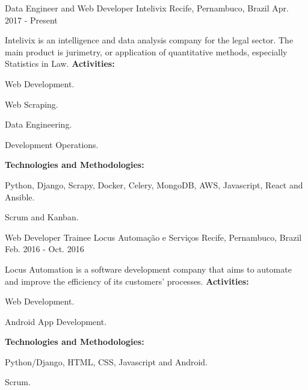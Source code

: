 


\begin{cventries}


\cventry
{Data Engineer and Web Developer} %
{Intelivix} %
{Recife, Pernambuco, Brazil} %
{Apr. 2017 - Present} %
{ %
Intelivix is an intelligence and data analysis company for the legal sector. The main product is
jurimetry, or application of quantitative methods, especially Statistics in Law. \vspace{1.5mm} \hfill \break
\textbf{Activities:} \hfill \break
\begin{cvitems}
\item {Web Development.}
\item {Web Scraping.}
\item {Data Engineering.}
\item {Development Operations.}
\end{cvitems} \vspace{1.5mm} \hfill \break
\textbf{Technologies and Methodologies:} \hfill \break
\begin{cvitems}
\item {Python, Django, Scrapy, Docker, Celery, MongoDB, AWS, Javascript, React and Ansible.}
\item {Scrum and Kanban.}
\end{cvitems}
}


\cventry
{Web Developer Trainee} %
{Locus Automação e Serviços} %
{Recife, Pernambuco, Brazil} %
{Feb. 2016 - Oct. 2016} %
{ %
Locus Automation is a software development company that aims to automate and improve the
efficiency of its customers' processes. \vspace{1.5mm} \hfill \break
\textbf{Activities:} \hfill \break
\begin{cvitems}
\item {Web Development.}
\item {Android App Development.}
\end{cvitems} \vspace{1.5mm} \hfill \break
\textbf{Technologies and Methodologies:} \hfill \break
\begin{cvitems}
\item {Python/Django, HTML, CSS, Javascript and Android.}
\item {Scrum.}
\end{cvitems}
}


\end{cventries}

